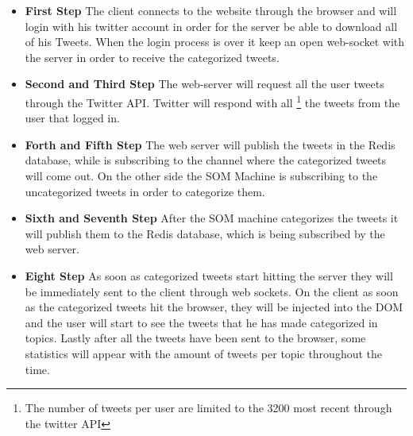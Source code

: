 \begin{itemize}
  \item \textbf{First Step} The client connects to the website through the browser and will login with his twitter account in order for the server be able to download all of his Tweets. When the login process is over it keep an open web-socket with the server in order to receive the categorized tweets.
  \item \textbf{Second and Third Step} The web-server will request all the user tweets through the Twitter API. Twitter will respond with all \footnote{The number of tweets per user are limited to the 3200 most recent through the twitter API} the tweets from the user that logged in.
  \item \textbf{Forth and Fifth Step} The web server will publish the tweets in the Redis database, while is subscribing to the channel where the categorized tweets will come out. On the other side the SOM Machine is subscribing to the uncategorized tweets in order to categorize them.
  \item \textbf{Sixth and Seventh Step} After the SOM machine categorizes the tweets it will publish them to the Redis database, which is being subscribed by the web server.
  \item \textbf{Eight Step} As soon as categorized tweets start hitting the server they will be immediately sent to the client through web sockets. On the client as soon as the categorized tweets hit the browser, they will be injected into the DOM and the user will start to see the tweets that he has made categorized in topics. Lastly after all the tweets have been sent to the browser, some statistics will appear with the amount of tweets per topic throughout the time.
\end{itemize}

 
